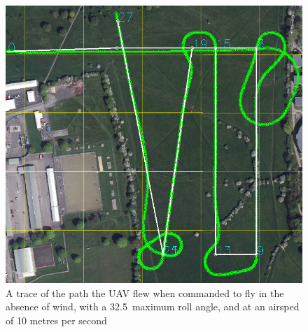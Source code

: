 \begin{figure}[htbp!] 
\centering    
\includegraphics[width=\textwidth]{32_10_NoWind}
\caption{A trace of the path the UAV flew when commanded to fly in the absence of wind, with a 32.5\degree\  maximum roll angle, and at an airsped of 10 metres per second}
\end{figure}